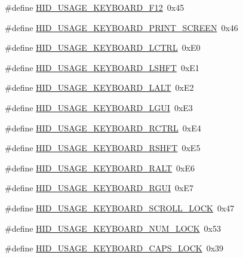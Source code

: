 \begin{DoxyCompactItemize}
\item 
\#define \hyperlink{group___u_s_b_d___h_i_d_gaeb5ad09697c27e0982443080d198accd}{H\+I\+D\+\_\+\+U\+S\+A\+G\+E\+\_\+\+K\+E\+Y\+B\+O\+A\+R\+D\+\_\+\+F12}~0x45
\item 
\#define \hyperlink{group___u_s_b_d___h_i_d_gad4754982a8d78739f7439a29ca8a8241}{H\+I\+D\+\_\+\+U\+S\+A\+G\+E\+\_\+\+K\+E\+Y\+B\+O\+A\+R\+D\+\_\+\+P\+R\+I\+N\+T\+\_\+\+S\+C\+R\+E\+EN}~0x46
\item 
\#define \hyperlink{group___u_s_b_d___h_i_d_gae3b79c5b31060eabe7779b54cb164f6d}{H\+I\+D\+\_\+\+U\+S\+A\+G\+E\+\_\+\+K\+E\+Y\+B\+O\+A\+R\+D\+\_\+\+L\+C\+T\+RL}~0x\+E0
\item 
\#define \hyperlink{group___u_s_b_d___h_i_d_ga294341928862609e496b3092d56141f4}{H\+I\+D\+\_\+\+U\+S\+A\+G\+E\+\_\+\+K\+E\+Y\+B\+O\+A\+R\+D\+\_\+\+L\+S\+H\+FT}~0x\+E1
\item 
\#define \hyperlink{group___u_s_b_d___h_i_d_ga828bbc2e17dd2f1d57dbc35763af7e58}{H\+I\+D\+\_\+\+U\+S\+A\+G\+E\+\_\+\+K\+E\+Y\+B\+O\+A\+R\+D\+\_\+\+L\+A\+LT}~0x\+E2
\item 
\#define \hyperlink{group___u_s_b_d___h_i_d_ga45a8236a486055442173a043f1e78b0e}{H\+I\+D\+\_\+\+U\+S\+A\+G\+E\+\_\+\+K\+E\+Y\+B\+O\+A\+R\+D\+\_\+\+L\+G\+UI}~0x\+E3
\item 
\#define \hyperlink{group___u_s_b_d___h_i_d_gab288a000028dab0d7a6683d9d0e66991}{H\+I\+D\+\_\+\+U\+S\+A\+G\+E\+\_\+\+K\+E\+Y\+B\+O\+A\+R\+D\+\_\+\+R\+C\+T\+RL}~0x\+E4
\item 
\#define \hyperlink{group___u_s_b_d___h_i_d_ga16c1d891765fa8aeede0394ca98fb87d}{H\+I\+D\+\_\+\+U\+S\+A\+G\+E\+\_\+\+K\+E\+Y\+B\+O\+A\+R\+D\+\_\+\+R\+S\+H\+FT}~0x\+E5
\item 
\#define \hyperlink{group___u_s_b_d___h_i_d_gaf43e59f05daae6f0dcbc849464e2789c}{H\+I\+D\+\_\+\+U\+S\+A\+G\+E\+\_\+\+K\+E\+Y\+B\+O\+A\+R\+D\+\_\+\+R\+A\+LT}~0x\+E6
\item 
\#define \hyperlink{group___u_s_b_d___h_i_d_ga556095c359b0a078bc0aa99cd78ab227}{H\+I\+D\+\_\+\+U\+S\+A\+G\+E\+\_\+\+K\+E\+Y\+B\+O\+A\+R\+D\+\_\+\+R\+G\+UI}~0x\+E7
\item 
\#define \hyperlink{group___u_s_b_d___h_i_d_ga08cb9b6d6951f1d62d09cad92225beb6}{H\+I\+D\+\_\+\+U\+S\+A\+G\+E\+\_\+\+K\+E\+Y\+B\+O\+A\+R\+D\+\_\+\+S\+C\+R\+O\+L\+L\+\_\+\+L\+O\+CK}~0x47
\item 
\#define \hyperlink{group___u_s_b_d___h_i_d_ga3e2e485b200dc9ce936ded0d045ff4b7}{H\+I\+D\+\_\+\+U\+S\+A\+G\+E\+\_\+\+K\+E\+Y\+B\+O\+A\+R\+D\+\_\+\+N\+U\+M\+\_\+\+L\+O\+CK}~0x53
\item 
\#define \hyperlink{group___u_s_b_d___h_i_d_gaa75d2912123a694a9e0de0761a7d631b}{H\+I\+D\+\_\+\+U\+S\+A\+G\+E\+\_\+\+K\+E\+Y\+B\+O\+A\+R\+D\+\_\+\+C\+A\+P\+S\+\_\+\+L\+O\+CK}~0x39
\end{DoxyCompactItemize}
